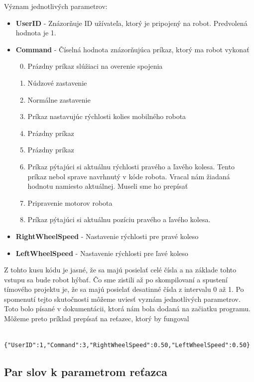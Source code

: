 \noindent Význam jednotlivých parametrov:
\begin{itemize}
	\item \textbf{UserID} - Znázorňuje ID užívateľa, ktorý je pripojený na robot. Predvolená hodnota je 1.
	\item \textbf{Command} -  Číselná hodnota znázorňujúca príkaz, ktorý ma robot vykonať
		\begin{enumerate}
			\setcounter{enumi}{-1}
			\item Prázdny príkaz slúžiaci na overenie spojenia
			\item Núdzové zastavenie
			\item Normálne zastavenie
			\item Príkaz nastavujúc rýchlosti kolies mobilného robota
			\item Prázdny príkaz
			\item Prázdny príkaz
			\item Príkaz pýtajúci si aktuálnu rýchlosti pravého a ľavého kolesa. Tento príkaz nebol sprave navrhnutý v kóde robota. Vracal nám žiadaná hodnotu
				namiesto aktuálnej. Museli sme ho prepísať
			\item Pripravenie motorov robota
			\item Príkaz pýtajúci si aktuálnu pozíciu pravého a ľavého kolesa.
		\end{enumerate}
	\item \textbf{RightWheelSpeed} - Nastavenie rýchlosti pre pravé koleso
	\item \textbf{LeftWheelSpeed} - Nastavenie rýchlosti pre ľavé koleso
\end{itemize}

\noindent Z tohto kusu kódu je jasné, že sa majú posielať celé čísla a na základe tohto vstupu sa bude robot hýbať. Čo sme zistili až po skompilovaní
a spustení tímového projektu je, že sa majú posielať desatinné čísla z intervalu 0 až 1. Po spomenutí tejto skutočnosti môžeme uviesť vyznám jednotlivých parametrov.
Toto bolo písané v dokumentácii, ktorá nám bola dodaná na začiatku programu. Môžeme preto príklad prepísať na reťazec, ktorý by fungoval

\label{jsonSpeedRequestGood}
\begin{lstlisting}
		{"UserID":1,"Command":3,"RightWheelSpeed":0.50,"LeftWheelSpeed":0.50}
\end{lstlisting}

\subsection{Par slov k parametrom reťazca}

